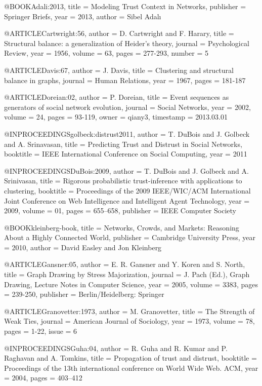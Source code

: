 @BOOK{Adali:2013,
  title = {Modeling Trust Context in Networks},
  publisher = {Springer Briefs},
  year = {2013},
  author = {Sibel Adal{\i}}
}

@ARTICLE{Cartwright:56,
  author = {D. Cartwright and F. Harary},
  title = {Structural balance: a generalization of Heider's theory},
  journal = {Psychological Review},
  year = {1956},
  volume = {63},
  pages = {277-293},
  number = {5}
}

@ARTICLE{Davis:67,
  author = {J. Davis},
  title = {Clustering and structural balance in graphs},
  journal = {Human Relations},
  year = {1967},
  pages = {181-187}
}

@ARTICLE{Doreian:02,
  author = {P. Doreian},
  title = {Event sequences as generators of social network evolution},
  journal = {Social Networks},
  year = {2002},
  volume = {24},
  pages = {93-119},
  owner = {qiany3},
  timestamp = {2013.03.01}
}

@INPROCEEDINGS{golbeck:distrust2011,
  author = {T. DuBois and J. Golbeck and A. Srinavasan},
  title = {Predicting Trust and Distrust in Social Networks},
  booktitle = {IEEE International Conference on Social Computing},
  year = {2011}
}

@INPROCEEDINGS{DuBois:2009,
  author = {T. DuBois and J. Golbeck and A. Srinivasan},
  title = {Rigorous probabilistic trust-inference with applications to clustering},
  booktitle = {Proceedings of the 2009 IEEE/WIC/ACM International Joint Conference
	on Web Intelligence and Intelligent Agent Technology},
  year = {2009},
  volume = {01},
  pages = {655–658},
  publisher = {IEEE Computer Society}
}

@BOOK{kleinberg-book,
  title = {Networks, Crowds, and Markets: Reasoning About a Highly Connected
	World},
  publisher = {Cambridge University Press},
  year = {2010},
  author = {David Easley and Jon Kleinberg}
}

@ARTICLE{Gansner:05,
  author = {E. R. Gansner and Y. Koren and S. North},
  title = {Graph Drawing by Stress Majorization},
  journal = {J. Pach (Ed.), Graph Drawing, Lecture Notes in Computer Science},
  year = {2005},
  volume = {3383},
  pages = {239-250},
  publisher = {Berlin/Heidelberg: Springer}
}

@ARTICLE{Granovetter:1973,
  author = {M. Granovetter},
  title = {The Strength of Weak Ties},
  journal = {American Journal of Sociology},
  year = {1973},
  volume = {78},
  pages = {1-22},
  issue = {6}
}

@INPROCEEDINGS{Guha:04,
  author = {R. Guha and R. Kumar and P. Raghavan and A. Tomkins},
  title = {Propagation of trust and distrust},
  booktitle = {Proceedings of the 13th international conference on World Wide Web.
	ACM},
  year = {2004},
  pages = {403--412}
}

